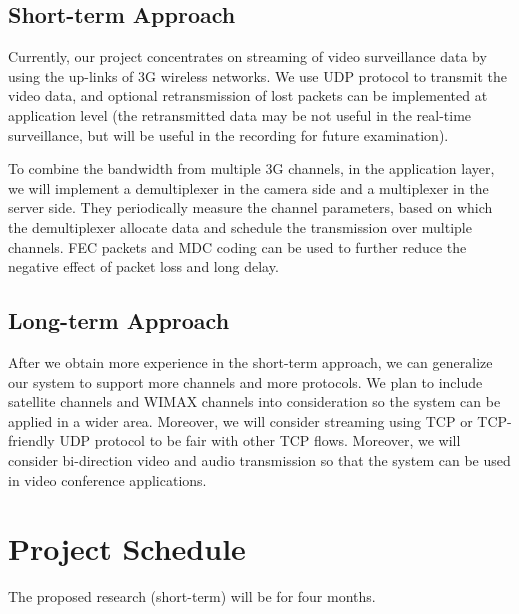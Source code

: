 \documentclass{article}
\begin{document}
    \subsection{Short-term Approach}
    Currently, our project concentrates on streaming of video surveillance data by using
    the up-links of 3G wireless networks. We use UDP protocol to transmit the video data,
    and optional retransmission of lost packets can be implemented at application level 
    (the retransmitted data may be not useful in the real-time surveillance, but will be
    useful in the recording for future examination).

    To combine the bandwidth from multiple 3G channels, in the application layer, 
    we will implement a demultiplexer in the camera side and a multiplexer in the server side.
    They periodically measure the channel parameters, based on which the demultiplexer
    allocate data and schedule the transmission over multiple channels. FEC packets and MDC
    coding can be used to further reduce the negative effect of packet loss and long delay.

    \subsection{Long-term Approach}
    After we obtain more experience in the short-term approach, we can generalize our system
    to support more channels and more protocols. We plan to include satellite channels and 
    WIMAX channels into consideration so the system can be applied in a wider area. Moreover,
    we will consider streaming using TCP or TCP-friendly UDP protocol to be fair with other 
    TCP flows. Moreover, we will consider bi-direction video and audio transmission
    so that the system can be used in video conference applications.

\section{Project Schedule}
    The proposed research (short-term) will be for four months. 
    
\end{document}
